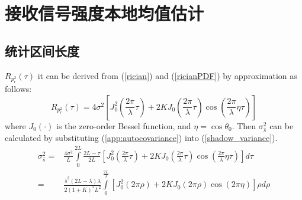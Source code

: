 
\chapter{接收信号强度本地均值估计}
\label{appchap:meanestimation}

\section{统计区间长度}
\label{appsec:lengthestimation}

$R_{p_{r}^2}(\tau)$ it can be derived from (\ref{rician}) and (\ref{ricianPDF}) by approximation\cite{Austin1994} as follows:
\begin{equation}
    R_{p_{r}^2}(\tau)=4\sigma^2\left[J_0^2\left(\frac{2\pi}{\lambda}\tau\right)+2KJ_0\left(\frac{2\pi}{\lambda}\tau\right)\cos\left(\frac{2\pi}{\lambda}\eta\tau\right)\right]
\label{app:autocovariance}
\end{equation}
where $J_0(\cdot)$ is the zero-order Bessel function, and $\eta=\cos\theta_0$. Then $\sigma_{\hat{s}}^2$ can be calculated by substituting (\ref{app:autocovariance}) into (\ref{shadow_variance}).
\begin{equation}
\begin{split}
\sigma_{\hat{s}}^{2}=&\frac{4\sigma^2}{L}\int\limits_{0}^{2L}\frac{2L-\tau}{2L}[J_0^2(\frac{2\pi}{\lambda}\tau)+2KJ_0(\frac{2\pi}{\lambda}\tau)\cos(\frac{2\pi}{\lambda}\eta\tau)]d\tau\\
=&\frac{\hat{s}^2(2L-\lambda)\lambda}{2(1+K)^{2}L^2}\int\limits_0^{\frac{2L}{\lambda}}[J_0^2(2\pi \rho)+2KJ_0(2\pi \rho)\cos(2\pi \eta)]\rho d\rho
\end{split}
\label{app:shadow_sigma}
\end{equation}
